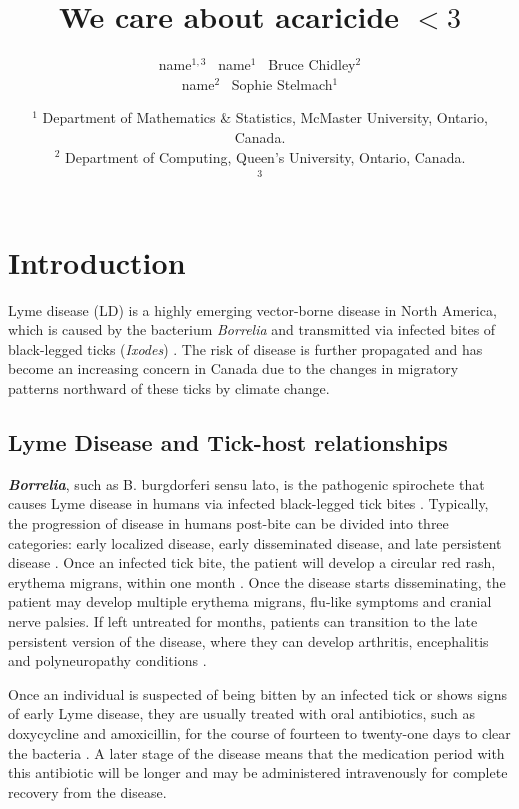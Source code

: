 \documentclass[12pt, centerh1]{article}
\title{We care about acaricide $<3$}
\author{\qquad name$^{1,3}$ \qquad\  name$^{1}$ \qquad\  Bruce Chidley$^{2}$ \\  name$^{2}$ \quad\ Sophie Stelmach$^{1}$}
\date{{\small $^1$ Department of Mathematics \& Statistics, McMaster University, Ontario, Canada.\\[-6pt]
$^2$ Department of Computing, Queen's University, Ontario, Canada.\\[-6pt]
$^3$ \\[-6pt]
}
}
\begin{document}
\maketitle
{
\hypersetup{linkcolor = black}
\tableofcontents
}
\newpage

\section{Introduction}
Lyme disease (LD) is a highly emerging vector-borne disease in North America, which is caused by the bacterium \textit{Borrelia} and transmitted via infected bites of black-legged ticks (\textit{Ixodes}) \citep{govcan}. The risk of disease is further propagated and has become an increasing concern in Canada due to the changes in migratory patterns northward of these ticks by climate change.

\subsection{Lyme Disease and Tick-host relationships}
\textbf{\textit{Borrelia}}, such as B. burgdorferi sensu lato, is the pathogenic spirochete that causes Lyme disease in humans via infected black-legged tick bites \citep{CDC_2022}. Typically, the progression of disease in humans post-bite can be divided into three categories: early localized disease, early disseminated disease, and late persistent disease \citep{MyHealth_Alberta}. Once an infected tick bite, the patient will develop a circular red rash, erythema migrans, within one month \citep{borrelia_shapiro}. Once the disease starts disseminating, the patient may develop multiple erythema migrans, flu-like symptoms and cranial nerve palsies. If left untreated for months, patients can transition to the late persistent version of the disease, where they can develop arthritis, encephalitis and polyneuropathy conditions \citep{borrelia_shapiro}. 

Once an individual is suspected of being bitten by an infected tick or shows signs of early Lyme disease, they are usually treated with oral antibiotics, such as doxycycline and amoxicillin, for the course of fourteen to twenty-one days to clear the bacteria \citep{borrelia_shapiro}. A later stage of the disease means that the medication period with this antibiotic will be longer and may be administered intravenously for complete recovery from the disease. 
\end{document}
